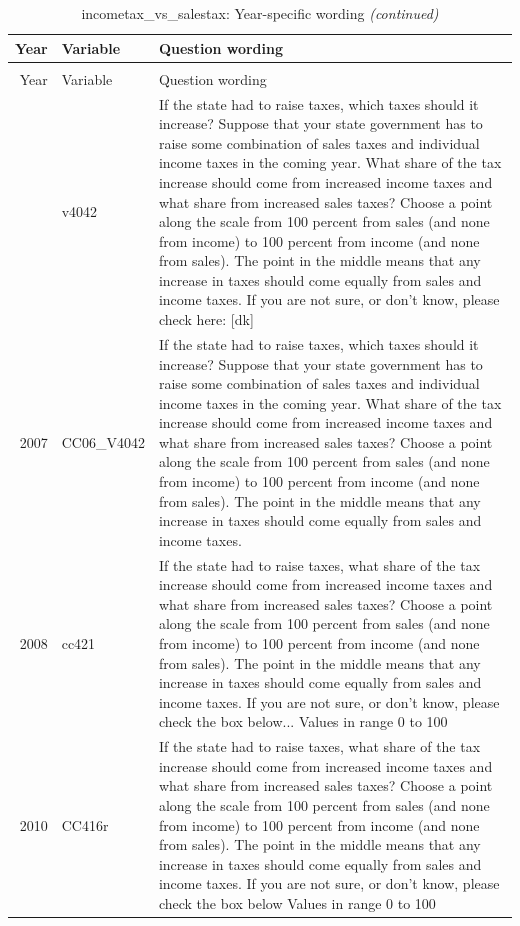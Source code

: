 \documentclass[12pt]{article}
\begin{document}
\begin{longtable}[t]{rl>{\raggedright\arraybackslash}p{10cm}}
\caption{\label{tab:unnamed-chunk-4}incometax\_vs\_salestax: Year-specific wording}\\
\toprule
Year & Variable & Question wording\\
\midrule
\endfirsthead
\caption[]{incometax\_vs\_salestax: Year-specific wording \textit{(continued)}}\\
\toprule
Year & Variable & Question wording\\
\midrule
\endhead
\
\endfoot
\bottomrule
\endlastfoot
2006 & v4042 & If the state had to raise taxes, which taxes should it increase? Suppose that your state government has to raise some combination of sales taxes and individual income taxes in the coming year. What share of the tax increase should come from increased income taxes and what share from increased sales taxes? Choose a point along the scale from 100 percent from sales (and none from income) to 100 percent from income (and none from sales). The point in the middle means that any increase in taxes should come equally from sales and income taxes.  If you are not sure, or don't know, please check here: [dk]\\
2007 & CC06\_V4042 & If the state had to raise taxes, which taxes should it increase? Suppose that your state government has to raise some combination of sales taxes and individual income taxes in the coming year. What share of the tax increase should come from increased income taxes and what share from increased sales taxes? Choose a point along the scale from 100 percent from sales (and none from income) to 100 percent from income (and none from sales). The point in the middle means that any increase in taxes should come equally from sales and income taxes.\\
2008 & cc421 & If the state had to raise taxes, what share of the tax increase should come from increased income taxes and what share from increased sales taxes? Choose a point along the scale from 100 percent from sales (and none from income) to 100 percent from income (and none from sales). The point in the middle means that any increase in taxes should come equally from sales and income taxes.  If you are not sure, or don't know, please check the box below... Values in range 0 to 100\\
2010 & CC416r & If the state had to raise taxes, what share of the tax increase should come from increased income taxes and what share from increased sales taxes? Choose a point along the scale from 100 percent from sales (and none from income) to 100 percent from income (and none from sales). The point in the middle means that any increase in taxes should come equally from sales and income taxes. If you are not sure, or don't know, please check the box below Values in range 0 to 100\\

\end{longtable}
\end{document}
